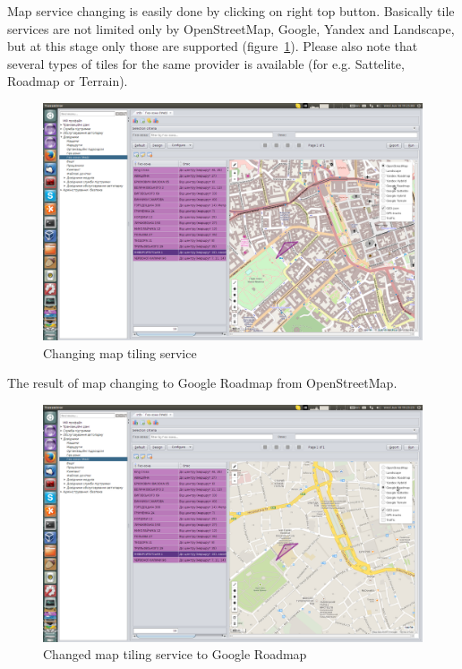 \newpage
Map service changing is easily done by clicking on right top button. Basically tile services are not limited only by OpenStreetMap, Google, Yandex and Landscape, but at this stage only those are supported (figure~\ref{fig:09}). Please also note that several types of tiles for the same provider is available (for e.g. Sattelite, Roadmap or Terrain).

\begin{figure}[H]
\centering
\includegraphics[width=\linewidth]{chapters/01-geozones/images/09-changing-map-tiling-service.png}
\caption{Changing map tiling service}\label{fig:09}
\end{figure}

\newpage
The result of map changing to Google Roadmap from OpenStreetMap.

\begin{figure}[H]
\centering
\includegraphics[width=\linewidth]{chapters/01-geozones/images/10-changed-map-tiling-service.png}
\caption{Changed map tiling service to Google Roadmap}\label{fig:10}
\end{figure}